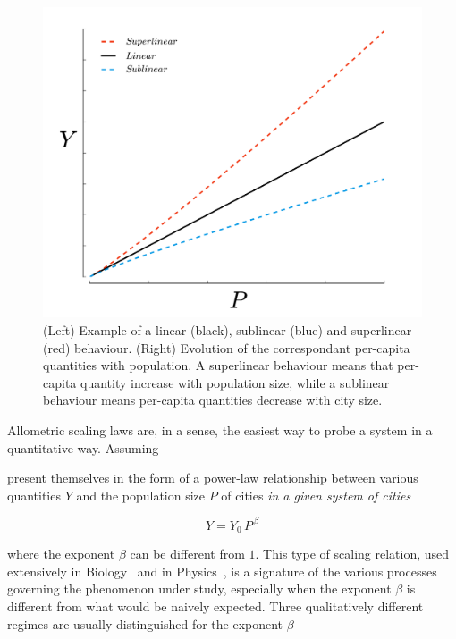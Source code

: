 \begin{figure}
    \centering
    \includegraphics[width=\textwidth]{gfx/chapter-scaling/scaling_scheme.pdf}
    \caption{(Left) Example of a linear (black), sublinear (blue) and superlinear (red)
    behaviour. (Right) Evolution of the correspondant per-capita quantities with
population. A superlinear behaviour means that per-capita quantity increase with
population size, while a sublinear behaviour means per-capita quantities
decrease with city size.\label{fig:scaling_scheme}}
\end{figure}

Allometric scaling laws are, in a sense, the easiest way to probe a system in a
quantitative way. Assuming 

present themselves in the form of a power-law
relationship between various quantities $Y$ and the population size $P$ of
cities \emph{in a given system of cities} 

\begin{equation}
    Y = Y_0\,P^{\,\beta}
    \label{eq:scaling_definition}
\end{equation}

where the exponent $\beta$ can be different from $1$. This type of scaling
relation, used extensively in Biology~\cite{Thompson:1942} and in
Physics~\cite{Barenblatt:1996}, is a signature of the various processes
governing the phenomenon under study, especially when the exponent $\beta$ is
different from what would be naively expected. Three qualitatively different regimes are
usually
distinguished for the exponent $\beta$~\cite{Bettencourt:2007}

